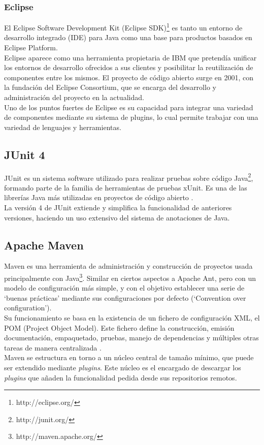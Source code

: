 \subsubsection{Eclipse}

El Eclipse Software Development Kit (Eclipse SDK)\footnote{http://eclipse.org/} es tanto un entorno de desarrollo integrado (IDE) para Java como una base para productos basados en Eclipse Platform.
\\
Eclipse aparece como una herramienta propietaria de IBM que pretendía unificar los entornos de desarrollo ofrecidos a sus clientes y posibilitar la reutilización de componentes entre los mismos.
El proyecto de código abierto surge en 2001, con la fundación del Eclipse Consortium, que se encarga del desarrollo y administración del proyecto en la actualidad. \cite{website:eclipseFAQ}
\\
Uno de los puntos fuertes de Eclipse es su capacidad para integrar una variedad de componentes mediante su sistema de plugins, lo cual permite trabajar con una variedad de lenguajes y herramientas.

\subsection{JUnit 4}

JUnit es un sistema software utilizado para realizar pruebas sobre código Java\footnote{http://junit.org/}, formando parte de la familia de herramientas de pruebas xUnit.
Es una de las librerías Java más utilizadas en proyectos de código abierto \cite{website:githubTOP}.
\\
La versión 4 de JUnit extiende y simplifica la funcionalidad de anteriores versiones, haciendo un uso extensivo del sistema de anotaciones de Java.

\subsection{Apache Maven}

Maven es una herramienta de administración y construcción de proyectos usada principalmente con Java\footnote{http://maven.apache.org/}.
Similar en ciertos aspectos a Apache Ant, pero con un modelo de configuración más simple, y con el objetivo establecer una serie de `buenas prácticas' mediante sus configuraciones por defecto (`Convention over configuration').
\\
Su funcionamiento se basa en la existencia de un fichero de configuración XML, el POM (Project Object Model).
Este fichero define la construcción, emisión documentación, empaquetado, pruebas, manejo de dependencias y múltiples otras tareas de manera centralizada \cite{mvnEx}.
\\
Maven se estructura en torno a un núcleo central de tamaño mínimo, que puede ser extendido mediante \emph{plugins}.
Este núcleo es el encargado de descargar los \emph{plugins} que añaden la funcionalidad pedida desde sus repositorios remotos.

